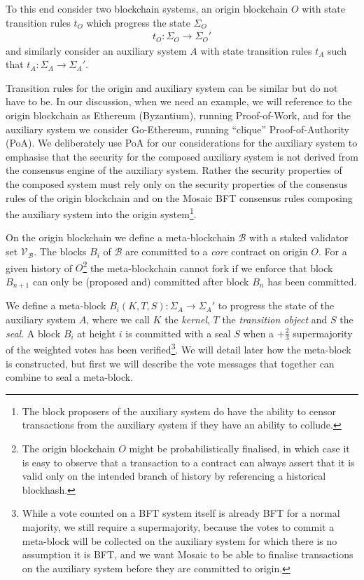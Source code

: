 \documentclass[12pt,a4paper]{article}
\begin{document}
To this end consider two blockchain systems, an origin blockchain $O$ with state transition rules $t_O$ which progress the state $\Sigma_O$ 
\begin{align} \label{state_transition_rules}
  t_O : \Sigma_O \rightarrow \Sigma_O'
\end{align}
and similarly consider an auxiliary system $A$ with state transition rules $t_A$ such that $t_A : \Sigma_A \rightarrow \Sigma_A'$.

Transition rules for the origin and auxiliary system can be similar but do not have to be. In our discussion, when we need an example, we will reference to the origin blockchain as Ethereum (Byzantium), running Proof-of-Work, and for the auxiliary system we consider Go-Ethereum, running ``clique'' Proof-of-Authority (PoA).  We deliberately use PoA for our considerations for the auxiliary system to emphasise that the security for the composed auxiliary system is not derived from the consensus engine of the auxiliary system. Rather the security properties of the composed system must rely only on the security properties of the consensus rules of the origin blockchain and on the Mosaic BFT consensus rules composing the auxiliary system into the origin system\footnote{The block proposers of the auxiliary system do have the ability to censor transactions from the auxiliary system if they have an ability to collude.}.

On the origin blockchain we define a meta-blockchain $\mathcal{B}$ with a staked validator set $\mathcal{V}_\mathcal{B}$. The blocks $B_i$ of $\mathcal{B}$ are committed to a \emph{core} contract on origin $O$. For a given history of $O$\footnote{The origin blockchain $O$ might be probabilistically finalised, in which case it is easy to observe that a transaction to a contract can always assert that it is valid only on the intended branch of history by referencing a historical blockhash.} the meta-blockchain cannot fork if we enforce that block $B_{n+1}$ can only be (proposed and) committed after block $B_n$ has been committed.

We define a meta-block $B_i(K, T, S): \Sigma_A \rightarrow \Sigma_A'$ to progress the state of the auxiliary system $A$, where we call $K$ the \emph{kernel}, $T$ the \emph{transition object} and $S$ the \emph{seal}.  A block $B_i$ at height $i$ is committed with a seal $S$ when a $+\tfrac{2}{3}$ supermajority of the weighted votes has been verified\footnote{While a vote counted on a BFT system itself is already BFT for a normal majority, %
we still require a supermajority, because the votes to commit a meta-block will be collected on the auxiliary system for which there is no assumption it is BFT, and we want Mosaic to be able to finalise transactions on the auxiliary system before they are committed to origin.}. We will detail later how the meta-block is constructed, but first we will describe the vote messages that together can combine to seal a meta-block.
\end{document}
